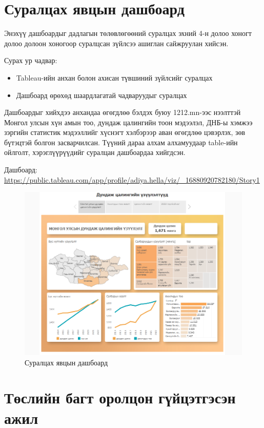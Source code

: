 \section{Суралцах явцын дашбоард}

Энэхүү дашбоардыг дадлагын төлөвлөгөөний суралцах эхний 4-н долоо хоногт долоо долоон хоногоор суралцсан зүйлсээ ашиглан сайжруулан хийсэн.

Сурах ур чадвар: 
\begin{itemize}
    \item Tableau-ийн анхан болон ахисан түвшиний зүйлсийг суралцах
    \item Дашбоард өрөхөд шаардлагатай чадваруудыг суралцах
\end{itemize}

Дашбоардыг хийхдээ анхандаа өгөгдлөө бэлдэх буюу 1212.mn-ээс нээлттэй Монгол улсын хүн амын тоо, дундаж цалингийн тоон мэдээлэл, ДНБ-ы хэмжээ зэргийн статистик мэдээллийг хүснэгт хэлбэрээр аван өгөгдлөө цэвэрлэх, зөв бүтэцтэй болгон засварчилсан. Түүний дараа алхам алхамуудаар table-ийн ойлголт, хэрэглүүрүүдийг суралцан дашбоардаа хийгдсэн.

Дашбоард: \url{https://public.tableau.com/app/profile/adiya.hella/viz/_16880920782180/Story1}
\begin{figure}
	\centering
	\includegraphics[width=15cm]{images/dash1.PNG}
	\caption{Суралцах явцын дашбоард}
	\label{fig:form}
\end{figure}

\newpage
\section{Төслийн багт оролцон гүйцэтгэсэн ажил}

